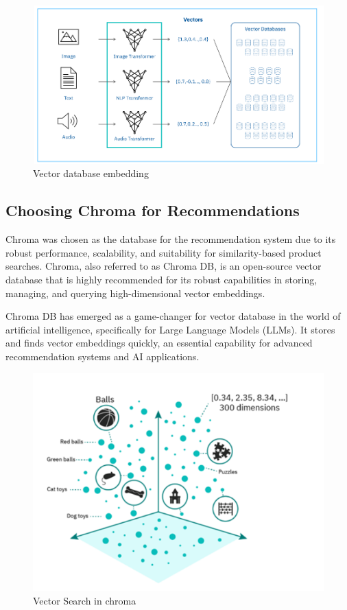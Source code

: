 \begin{center}
\begin{figure}[H]
    \includegraphics[scale=0.45]{images/vectorDB.png}
    \caption{Vector database embedding} 
    \label{fig:vectorDB}
\end{figure}
\end{center}

\subsection{Choosing Chroma for Recommendations}
Chroma was chosen as the database for the recommendation system due to its robust performance, scalability, and suitability for similarity-based product searches.
Chroma, also referred to as Chroma DB, is an open-source vector database that is highly recommended for its robust capabilities in storing, managing, and querying high-dimensional vector embeddings\cite{chroma_docs_2025}.
\par Chroma DB has emerged as a game-changer for vector database in the world of artificial intelligence, specifically for Large Language Models (LLMs). It stores and finds vector embeddings quickly, an essential capability for advanced recommendation systems and AI applications. 
\begin{center}
\begin{figure}[H]
    \includegraphics[scale=0.66]{images/chroma_space.png}
    \caption{Vector Search in chroma} 
    \label{fig:vector_search}
\end{figure}
\end{center}

